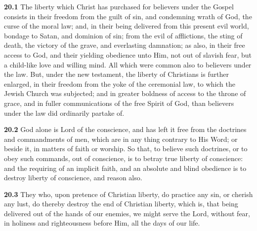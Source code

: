\par\textbf{20.1} The liberty which Christ has purchased for believers under the Gospel consists in their freedom from the guilt of sin, and condemning wrath of God, the curse of the moral law; and, in their being delivered from this present evil world, bondage to Satan, and dominion of sin; from the evil of afflictions, the sting of death, the victory of the grave, and everlasting damnation; as also, in their free access to God, and their yielding obedience unto Him, not out of slavish fear, but a child-like love and willing mind. All which were common also to believers under the law. But, under the new testament, the liberty of Christians is further enlarged, in their freedom from the yoke of the ceremonial law, to which the Jewish Church was subjected; and in greater boldness of access to the throne of grace, and in fuller communications of the free Spirit of God, than believers under the law did ordinarily partake of.   

\par\textbf{20.2} God alone is Lord of the conscience, and has left it free from the doctrines and commandments of men, which are in any thing contrary to His Word; or beside it, in matters of faith or worship. So that, to believe such doctrines, or to obey such commands, out of conscience, is to betray true liberty of conscience: and the requiring of an implicit faith, and an absolute and blind obedience is to destroy liberty of conscience, and reason also.   

\par\textbf{20.3} They who, upon pretence of Christian liberty, do practice any sin, or cherish any lust, do thereby destroy the end of Christian liberty, which is, that being delivered out of the hands of our enemies, we might serve the Lord, without fear, in holiness and righteousness before Him, all the days of our life.   

